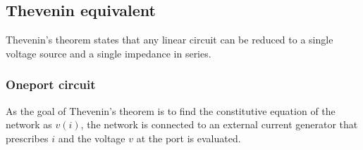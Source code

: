 \documentclass[letterpaper,10pt,english]{jupyterBook}
\begin{document}
\subsection{Thevenin equivalent}
\label{\detokenize{ch/electrical-engineering-networks:thevenin-equivalent}}\label{\detokenize{ch/electrical-engineering-networks:classical-electromagnetism-electrical-engineering-newtork-analysis-thevenin}}
\sphinxAtStartPar
{} Thevenin’s theorem states that any linear circuit can be reduced to a single voltage source and a single impedance in series.


\subsubsection{One\sphinxhyphen{}port circuit}
\label{\detokenize{ch/electrical-engineering-networks:one-port-circuit}}\label{\detokenize{ch/electrical-engineering-networks:classical-electromagnetism-electrical-engineering-newtork-analysis-thevenin-1-port}}
\sphinxAtStartPar
As the goal of Thevenin’s theorem is to find the constitutive equation of the network as \(v(i)\), the network is connected to an external current generator that prescribes \(i\) and the voltage \(v\) at the port is evaluated.
\end{document}
